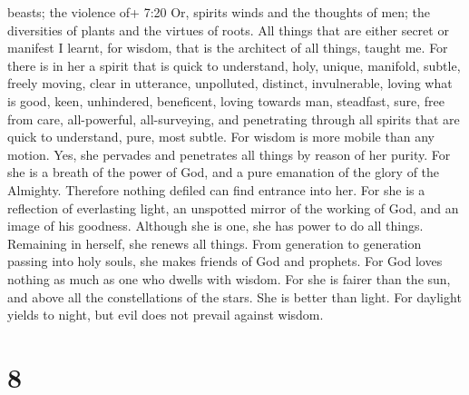 beasts; the violence of+ 7:20 Or, spirits winds and the thoughts of men;
the diversities of plants and the virtues of roots.  All
things that are either secret or manifest I learnt,  for
wisdom, that is the architect of all things, taught me. For there is in
her a spirit that is quick to understand, holy, unique, manifold,
subtle, freely moving, clear in utterance, unpolluted, distinct,
invulnerable, loving what is good, keen, unhindered, 
beneficent, loving towards man, steadfast, sure, free from care,
all-powerful, all-surveying, and penetrating through all spirits that
are quick to understand, pure, most subtle.  For wisdom is
more mobile than any motion. Yes, she pervades and penetrates all things
by reason of her purity.  For she is a breath of the power
of God, and a pure emanation of the glory of the Almighty. Therefore
nothing defiled can find entrance into her.  For she is a
reflection of everlasting light, an unspotted mirror of the working of
God, and an image of his goodness.  Although she is one,
she has power to do all things. Remaining in herself, she renews all
things. From generation to generation passing into holy souls, she makes
friends of God and prophets.  For God loves nothing as much
as one who dwells with wisdom.  For she is fairer than the
sun, and above all the constellations of the stars. She is better than
light.  For daylight yields to night, but evil does not
prevail against wisdom.

\hypertarget{section-7}{%
\section{8}\label{section-7}}

